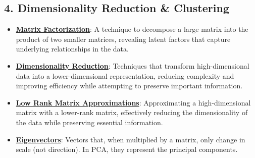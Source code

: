 \documentclass{article}%
\begin{document}
\subsection{4. Dimensionality Reduction \& Clustering}%
\label{subsec:4.DimensionalityReductionClustering}%
\begin{itemize}[leftmargin=*]%
\item \href{https://purdue.brightspace.com/d2l/common/assets/pdfjs-d2l-dist/1.0.14-legacy/web/viewer.html?file=\%2Fcontent\%2Fenforced\%2F1095467-wl.202510.CS.24300.001\%2F11L2-svd-pca-recommender.pdf\%3Fou\%3D1095467\&lang=en-us\&container=d2l-fileviewer-rendered-pdf\&fullscreen=d2l-fileviewer-rendered-pdf-dialog\&height=667#page=2}{\textbf{Matrix Factorization}}: A technique to decompose a large matrix into the product of two smaller matrices, revealing latent factors that capture underlying relationships in the data.%
\item \href{https://purdue.brightspace.com/d2l/common/assets/pdfjs-d2l-dist/1.0.14-legacy/web/viewer.html?file=\%2Fcontent\%2Fenforced\%2F1095467-wl.202510.CS.24300.001\%2F11L2-svd-pca-recommender.pdf\%3Fou\%3D1095467\&lang=en-us\&container=d2l-fileviewer-rendered-pdf\&fullscreen=d2l-fileviewer-rendered-pdf-dialog\&height=667#page=8}{\textbf{Dimensionality Reduction}}: Techniques that transform high-dimensional data into a lower-dimensional representation, reducing complexity and improving efficiency while attempting to preserve important information.%
\item \href{https://purdue.brightspace.com/d2l/common/assets/pdfjs-d2l-dist/1.0.14-legacy/web/viewer.html?file=\%2Fcontent\%2Fenforced\%2F1095467-wl.202510.CS.24300.001\%2F11L2-svd-pca-recommender.pdf\%3Fou\%3D1095467\&lang=en-us\&container=d2l-fileviewer-rendered-pdf\&fullscreen=d2l-fileviewer-rendered-pdf-dialog\&height=667#page=9}{\textbf{Low Rank Matrix Approximations}}: Approximating a high-dimensional matrix with a lower-rank matrix, effectively reducing the dimensionality of the data while preserving essential information.%
\item \href{https://purdue.brightspace.com/d2l/common/assets/pdfjs-d2l-dist/1.0.14-legacy/web/viewer.html?file=\%2Fcontent\%2Fenforced\%2F1095467-wl.202510.CS.24300.001\%2F11L2-svd-pca-recommender.pdf\%3Fou\%3D1095467\&lang=en-us\&container=d2l-fileviewer-rendered-pdf\&fullscreen=d2l-fileviewer-rendered-pdf-dialog\&height=667#page=17}{\textbf{Eigenvectors}}: Vectors that, when multiplied by a matrix, only change in scale (not direction). In PCA, they represent the principal components.%

\end{itemize}
\end{document}
